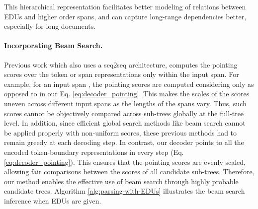 This hierarchical representation facilitates better modeling of relations between EDUs and higher order spans, and can capture long-range dependencies better, especially for long documents.   



\paragraph{Incorporating Beam Search.} 

Previous work \citep{lin-etal-2019-unified, zhang-etal-2020-top} which also uses a seq2seq architecture, computes the pointing scores over the token or span representations only within the input span. For example, for an input span , the pointing scores are computed considering only  as opposed to  in our Eq. \ref{eq:decoder_pointing}. This makes the scales of the scores uneven across different input spans as the lengths of the spans vary. Thus, such scores cannot be objectively compared across sub-trees globally at the full-tree level. In addition, since efficient global search methods like beam search cannot be applied properly with non-uniform scores, these previous methods had to remain greedy at each decoding step. In contrast, our decoder points to all the encoded token-boundary representations in every step (Eq. \ref{eq:decoder_pointing}). This ensures that the pointing scores are evenly scaled, allowing fair comparisons between the scores of all candidate sub-trees. Therefore, our method enables the effective use of beam search through highly probable candidate trees. Algorithm \ref{alg:parsing-with-EDUs} illustrates the beam search inference when EDUs are given. 



